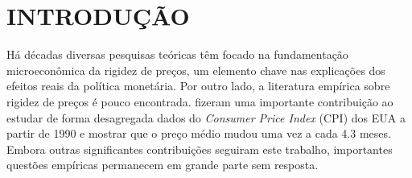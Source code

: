 \documentclass[twoside,a4paper,11pt]{report}
\begin{document}





\listoffigures

\listoftables

\printnomenclature

\tableofcontents

\cleardoublepage

\pagestyle{fancy}


\chapter{INTRODUÇÃO}\label{intro}

Há décadas diversas pesquisas teóricas têm focado na fundamentação microeconômica da rigidez de preços, um elemento chave nas explicações dos efeitos reais da política monetária. Por outro lado, a literatura empírica sobre rigidez de preços é pouco encontrada. \citet{bils2004some} fizeram uma importante contribuição ao estudar de forma desagregada dados do \emph{Consumer Price Index} (CPI) dos EUA a partir de 1990 e mostrar que o preço médio mudou uma vez a cada 4.3 meses. Embora outras significantes contribuições seguiram este trabalho, importantes questões empíricas permanecem em grande parte sem resposta.
\end{document}
